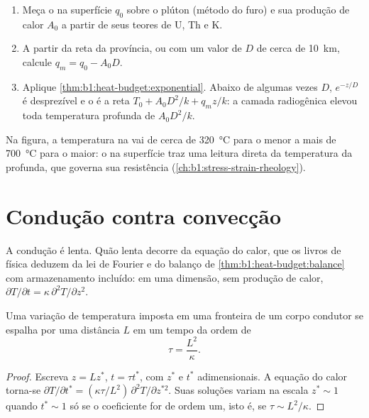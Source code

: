 \begin{method}\label{met:b1:heat-budget:moho}
\begin{enumerate}
  \item Meça o  na superfície $q_0$ sobre o plúton (método do furo)
        e sua produção de calor $A_0$ a partir de seus teores de U, Th e K.
  \item A partir da reta da província, ou com um valor de $D$ de cerca de
        \qty{10}{km}, calcule $q_m = q_0 - A_0 D$.
  \item Aplique \cref{thm:b1:heat-budget:exponential}. Abaixo de algumas vezes $D$,
        $e^{-z/D}$ é desprezível e o  é a reta
        $T_0 + A_0D^2/k + q_m z/k$: a camada radiogênica elevou toda temperatura
        profunda de $A_0D^2/k$.
\end{enumerate}
\end{method}

Na figura, a temperatura na  vai de cerca de \qty{320}{\degreeCelsius}
para o menor  a mais de \qty{700}{\degreeCelsius} para o maior: o  na superfície traz uma leitura direta da
temperatura da  profunda, que governa sua resistência
(\cref{ch:b1:stress-strain-rheology}).

\section{Condução contra convecção}

A condução é lenta. Quão lenta decorre da equação do calor, que os livros de física
deduzem da lei de Fourier e do balanço de
\cref{thm:b1:heat-budget:balance} com armazenamento incluído: em uma dimensão, sem
produção de calor,
$\partial T/\partial t = \kappa\,\partial^2 T/\partial z^2$.

\begin{proposition}\label{prop:b1:heat-budget:timescale}
Uma variação de temperatura imposta em uma fronteira de um corpo condutor se espalha por uma
distância $L$ em um tempo da ordem de
\[
  \tau = \frac{L^2}{\kappa} .
\]
\end{proposition}

\begin{proof}
Escreva $z = L z^*$, $t = \tau t^*$, com $z^*$ e $t^*$ adimensionais. A
equação do calor torna-se $\partial T/\partial t^* = (\kappa\tau/L^2)\,\partial^2
T/\partial z^{*2}$. Suas soluções variam na escala $z^* \sim 1$ quando $t^* \sim 1$
só se o coeficiente for de ordem um, isto é, se $\tau \sim L^2/\kappa$.
\end{proof}

